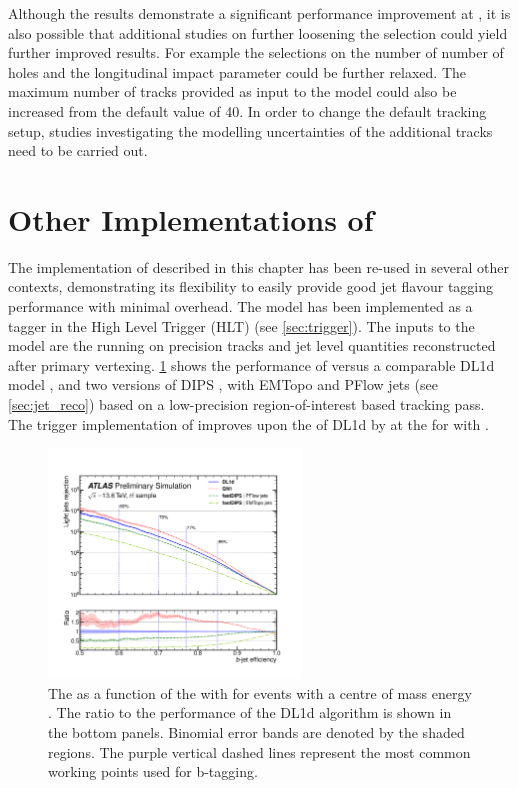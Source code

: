 Although the results demonstrate a significant performance improvement at \highpt, it is also possible that additional studies on further loosening the selection could yield further improved results.
For example the selections on the number of number of holes and the longitudinal impact parameter could be further relaxed.
The maximum number of tracks provided as input to the model could also be increased from the default value of 40.
In order to change the default tracking setup, studies investigating the modelling uncertainties of the additional tracks need to be carried out.



\section{Other Implementations of \GNN}\label{sec:gnn_trig_upgrade}

The implementation of \GNN described in this chapter has been re-used in several other contexts, demonstrating its flexibility to easily provide good jet flavour tagging performance with minimal overhead.
The model has been implemented as a \bjet tagger in the High Level Trigger (HLT) (see \cref{sec:trigger}).
The inputs to the model are the running on precision tracks and jet level quantities reconstructed after primary vertexing.
\cref{fig:gn1_trigger} shows the performance of \GNN versus a comparable DL1d model \cite{ATLAS:2022qxm}, and two versions of DIPS \cite{ATL-PHYS-PUB-2020-014}, with EMTopo and PFlow jets (see \cref{sec:jet_reco}) based on a low-precision region-of-interest based tracking pass.
The trigger implementation of \GNN improves upon the \lrej of DL1d by  at the  for \ttbarjets with \ttbarpt.

\begin{figure}[!htbp]
    \centering
    \includegraphics[width=0.6\textwidth]{chapters/gnn_tagger/figs/gn1_trigger.pdf}
    \caption{
        The \lrej as a function of the \beff \ttbarjets with \ttbarpt for events with a centre of mass energy  \cite{gn1-trigger}.
        The ratio to the performance of the DL1d algorithm \cite{ATLAS:2022qxm} is shown in the bottom panels.
        Binomial error bands are denoted by the shaded regions.
        The purple vertical dashed lines represent the most common working points used for b-tagging.
    }
    \label{fig:gn1_trigger}
\end{figure}


